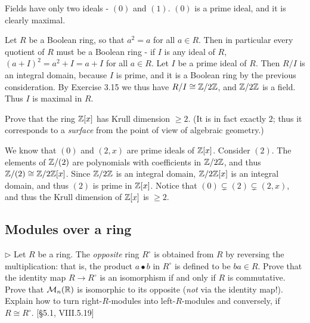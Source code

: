 \begin{solution}
	Fields have only two ideals - $(0)$ and $(1)$. $(0)$ is a prime ideal, and it is clearly maximal.
	
	Let $R$ be a Boolean ring, so that $a^2 = a$ for all $a \in R$. Then in particular every quotient of $R$ must be a Boolean ring - if $I$ is any ideal of $R$, $(a + I)^2 = a^2 + I = a + I$ for all $a \in R$. Let $I$ be a prime ideal of $R$. Then $R/I$ is an integral domain, because $I$ is prime, and it is a Boolean ring by the previous consideration.  By Exercise 3.15 we thus have $R/I \cong \mathbb{Z}/2\mathbb{Z}$, and $\mathbb{Z}/2\mathbb{Z}$ is a field. Thus $I$ is maximal in $R$.
\end{solution}

\begin{problem}
	Prove that the ring $\mathbb{Z}[x]$ has Krull dimension $\geq 2$. (It is in fact exactly $2$; thus it corresponds to a \emph{surface} from the point of view of algebraic geometry.)
\end{problem}

\begin{solution}
	We know that $(0)$ and $(2, x)$ are prime ideals of $\mathbb{Z}[x]$. Consider $(2)$. The elements of $\mathbb{Z}/(2)$ are polynomials with coefficients in $\mathbb{Z}/2\mathbb{Z}$, and thus $\mathbb{Z}/(2) \cong \mathbb{Z}/2\mathbb{Z}[x]$. Since $\mathbb{Z}/2\mathbb{Z}$ is an integral domain, $\mathbb{Z}/2\mathbb{Z}[x]$ is an integral domain, and thus $(2)$ is prime in $\mathbb{Z}[x]$. Notice that $(0) \subsetneq (2) \subsetneq (2, x)$, and thus the Krull dimension of $\mathbb{Z}[x]$ is $\geq 2$.
\end{solution}

\subsection{Modules over a ring}

\begin{problem}
	$\triangleright$ Let $R$ be a ring. The \emph{opposite} ring $R^\circ$ is obtained from $R$ by reversing the multiplication: that is, the product $a \bullet b$ in $R^\circ$ is defined to be $ba \in R$. Prove that the identity map $R \to R^\circ$ is an isomorphism if and only if $R$ is commutative. Prove that $\mathcal{M}_n(\mathbb{R})$ is isomorphic to its opposite (\emph{not} via the identity map!). Explain how to turn right-$R$-modules into left-$R$-modules and conversely, if $R \cong R^\circ$. [\S 5.1, VIII.5.19]
\end{problem}

